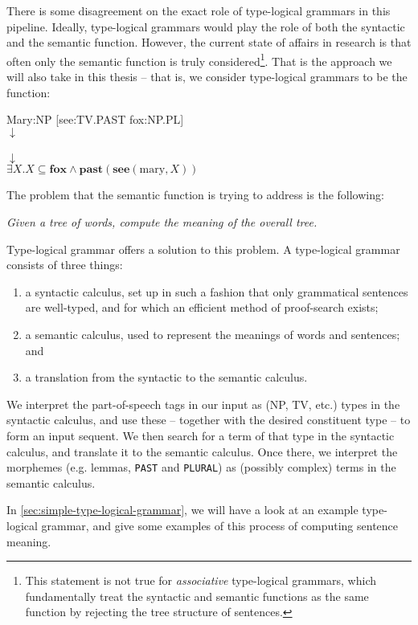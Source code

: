 \documentclass[a4paper]{article}
\begin{document}
There is some disagreement on the exact role of type-logical grammars in
this pipeline. Ideally, type-logical grammars would play the role of
both the syntactic and the semantic function. However, the current
state of affairs in research is that often only the semantic function
is truly considered\footnote{%
  This statement is not true for \emph{associative} type-logical
  grammars, which fundamentally treat the syntactic and semantic
  functions as the same function by rejecting the tree structure of
  sentences.
}. That is the approach we will also take in this thesis -- that is,
we consider type-logical grammars to be the function:
%
\begin{center}
  Mary:NP [see:TV.PAST fox:NP.PL]\\
  $\downarrow$\\
  \\
  $\downarrow$\\
  $\exists X.X\subseteq\mathbf{fox}\land\mathbf{past}(\mathbf{see}(\text{mary},X))$
\end{center}
%
The problem that the semantic function is trying to address is the
following:
%
\begin{center}\itshape
  Given a tree of words, compute the meaning of the overall tree.
\end{center}
%
Type-logical grammar offers a solution to this problem. A type-logical
grammar consists of three things:
\begin{enumerate}[label=(\arabic*)]
\item a syntactic calculus, set up in such a fashion that only
  grammatical sentences are well-typed, and for which an efficient
  method of proof-search exists;
\item a semantic calculus, used to represent the meanings of words and
  sentences; and
\item a translation from the syntactic to the semantic calculus.
\end{enumerate}
We interpret the part-of-speech tags in our input as (NP, TV, etc.)
types in the syntactic calculus, and use these -- together with the
desired constituent type -- to form an input sequent. We then search
for a term of that type in the syntactic calculus, and translate it to
the semantic calculus. Once there, we interpret the morphemes
(e.g. lemmas, \texttt{PAST} and \texttt{PLURAL}) as (possibly complex)
terms in the semantic calculus.

In \autoref{sec:simple-type-logical-grammar}, we will have a look at
an example type-logical grammar, and give some examples of this
process of computing sentence meaning.
\end{document}
